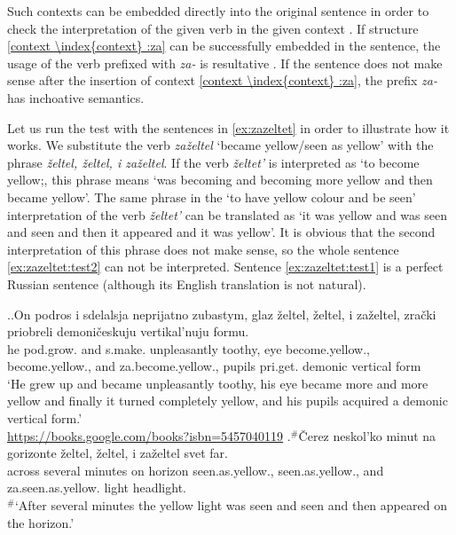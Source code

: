 Such contexts   can be embedded directly into the original sentence in order to check the interpretation of the given verb in the given context  . If structure \ref{context \index{context} :za} can be successfully embedded in the sentence, the usage of the verb prefixed with \textit{za-}   is resultative . If the sentence does not make sense after the insertion of context   \ref{context \index{context} :za}, the prefix \textit{za-}   has inchoative  semantics.

Let us run the test with the sentences in \ref{ex:zazeltet} in order to illustrate how it works. We substitute the verb \textit{za\v{z}eltel} `became yellow/seen as yellow' with the phrase \textit{\v{z}eltel, \v{z}eltel, i za\v{z}eltel}. If the verb \textit{\v{z}eltet'} is interpreted as `to become yellow;, this phrase means `was becoming and becoming more yellow and then became yellow'. The same phrase in the `to have yellow colour and be seen' interpretation of the verb \textit{\v{z}eltet'} can be translated as `it was yellow and was seen and seen and then it appeared and it was yellow'. It is obvious that the second interpretation of this phrase does not make sense, so the whole sentence \ref{ex:zazeltet:test2} can not be interpreted. Sentence \ref{ex:zazeltet:test1} is a perfect Russian sentence (although its English translation is not natural).

\ex.\label{ex:zazeltet:test}\ag.\label{ex:zazeltet:test1}On podros i sdelalsja neprijatno zubastym, glaz \v{z}eltel, \v{z}eltel, i za\v{z}eltel, zra\v{c}ki priobreli demoni\v{c}eskuju vertikal'nuju formu.\\
he pod.grow. and s.make. unpleasantly toothy, eye become.yellow., become.yellow., and za.become.yellow., pupils pri.get. demonic vertical form\\
\trans `He grew up and became unpleasantly toothy, his eye became more and more yellow and finally it turned completely yellow, and his pupils acquired a demonic vertical form.'\\\hbox{}\hfill\hbox{\url{https://books.google.com/books?isbn=5457040119}}
\bg.$^\#$\v{C}erez neskol'ko minut na gorizonte \v{z}eltel, \v{z}eltel, i za\v{z}eltel svet far.\label{ex:zazeltet:test2}\\
across several minutes on horizon seen.as.yellow., seen.as.yellow., and za.seen.as.yellow. light headlight.\\
\trans $^\#$`After several minutes the yellow light was seen and seen and then appeared on the horizon.'

